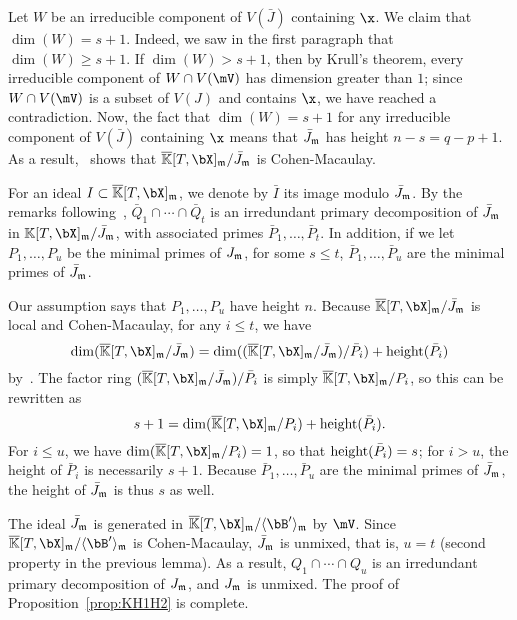 \documentclass[12pt]{article}
\begin{document}
Let $W$ be an irreducible component of $V(\bar J)$ containing $\x$.  We
claim that $\dim(W)=s+1$. Indeed, we saw in the first paragraph
that $\dim(W) \ge s+1$. If $\dim(W) > s+1$, then by Krull's theorem,
every irreducible component of $W \cap V(\mV)$ has dimension greater
than $1$; since $W \cap V(\mV)$ is a subset of $V(J)$ and contains $\x$,
we have reached a contradiction. Now, the fact that $\dim(W)=s+1$ for
any irreducible component of $V(\bar J)$ containing $\x$ means that
$\bar J_{\mathfrak{m}}$ has height $n-s=q-p+1$.  As a
result,~\cite[Theorem~18.18]{Eisenbud95} shows that
$\KKbar[T,\bX]_\m/\bar J_\m$ is Cohen-Macaulay.

For an ideal $I \subset \KKbar[T,\bX]_\m$, we denote by $\bar I$ its
image modulo $\bar J_{\mathfrak{m}}$.  By the remarks
following~\cite[Theorem~IV.5.9]{ZaSa58},
$\bar Q_1 \cap \cdots \cap \bar Q_t$ is an irredundant primary
decomposition of $\bar J_{\mathfrak{m}}$ in
$\KK[T,\bX]_\m/\bar J_\m$, with associated primes
$\bar P_1,\dots,\bar P_t$. In addition, if we let $P_1,\dots,P_u$ be
the minimal primes of $J_{\mathfrak{m}}$, for some $s \le t$,
$\bar P_1,\dots,\bar P_u$ are the minimal primes of $\bar J_{\mathfrak{m}}$.

Our assumption says that $P_1,\dots,P_u$ have height $n$. Because
$\KKbar[T,\bX]_\m/\bar J_\m$ is local and Cohen-Macaulay, for any
$i \le t$, we have 
$$\dim(\KKbar[T,\bX]_\m/\bar J_\m)=\dim((\KKbar[T,\bX]_\m/\bar J_\m) / \bar P_i) + {\rm height}(\bar P_i)$$
by~\cite[Theorem~17.4(i)]{Matsumura86}.
The factor ring $(\KKbar[T,\bX]_\m/\bar J_\m) / \bar P_i$ is simply
$\KKbar[T,\bX]_\m/P_i$, so this can be rewritten as
$$s+1 = \dim(\KKbar[T,\bX]_\m/P_i) + {\rm height}(\bar P_i).$$ For $i\le
u$, we have $\dim(\KKbar[T,\bX]_\m/P_i)=1$, so that ${\rm height}(\bar
P_i)=s$; for $i > u$, the height of $\bar P_i$ is necessarily
$s+1$. Because $\bar P_1,\dots,\bar P_u$ are the minimal primes of
$\bar J_{\mathfrak{m}}$, the height of $\bar J_{\mathfrak{m}}$ is thus $s$ as well.

The ideal $\bar J_{\mathfrak{m}}$ is generated in $\KKbar[T,\bX]_\m/\langle \bB'
\rangle_\m$ by $\mV$. Since $\KKbar[T,\bX]_\m/\langle
\bB' \rangle_\m$ is Cohen-Macaulay, $\bar J_{\mathfrak{m}}$ is unmixed, that is,
$u=t$ (second property in the previous lemma).  As a result, $Q_1 \cap
\cdots \cap Q_u$ is an irredundant primary decomposition of $J_{\mathfrak{m}}$,
and $J_{\mathfrak{m}}$ is unmixed. The proof of Proposition~\ref{prop:KH1H2} is complete.

\end{document}
